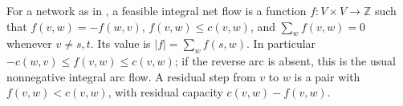 \begin{definition}
For a network as in , a feasible integral
net flow is a function $f:V\times V\to\mathbb Z$ such that
$f(v,w)=-f(w,v)$, $f(v,w)\leq c(v,w)$, and
$\sum_w f(v,w)=0$ whenever $v\ne s,t$.
Its value is $|f|=\sum_w f(s,w)$. In particular
$-c(w,v)\leq f(v,w)\leq c(v,w)$; if the reverse arc is absent, this
is the usual nonnegative integral arc flow. A residual step from $v$ to
$w$ is a pair with $f(v,w)<c(v,w)$, with residual capacity
$c(v,w)-f(v,w)$.
\end{definition}
